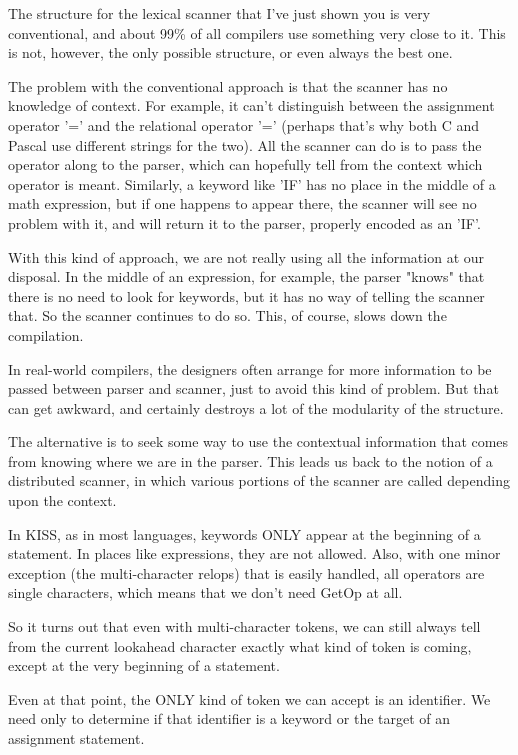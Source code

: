 \documentclass[float=false, crop=false]{standalone}
\begin{document}
The structure for the lexical scanner that I've just shown you is very
conventional, and about 99\% of all compilers use something very close to it.
This is not, however, the only possible structure, or even always the best one.

The problem with the conventional approach is that the scanner has no knowledge
of context. For example, it can't distinguish between the assignment operator
'=' and the relational operator '=' (perhaps that's why both C and Pascal use
different strings for the two). All the scanner can do is to pass the operator
along to the parser, which can hopefully tell from the context which operator is
meant. Similarly, a keyword like 'IF' has no place in the middle of a math
expression, but if one happens to appear there, the scanner will see no problem
with it, and will return it to the parser, properly encoded as an 'IF'.

With this kind of approach, we are not really using all the information at our
disposal. In the middle of an expression, for example, the parser "knows" that
there is no need to look for keywords, but it has no way of telling the scanner
that. So the scanner continues to do so. This, of course, slows down the
compilation.

In real-world compilers, the designers often arrange for more information to be
passed between parser and scanner, just to avoid this kind of problem. But that
can get awkward, and certainly destroys a lot of the modularity of the
structure.

The alternative is to seek some way to use the contextual information that comes
from knowing where we are in the parser. This leads us back to the notion of a
distributed scanner, in which various portions of the scanner are called
depending upon the context.

In KISS, as in most languages, keywords ONLY appear at the beginning of a
statement. In places like expressions, they are not allowed. Also, with one
minor exception (the multi-character relops) that is easily handled, all
operators are single characters, which means that we don't need GetOp at all.

So it turns out that even with multi-character tokens, we can still always tell
from the current lookahead character exactly what kind of token is coming,
except at the very beginning of a statement.

Even at that point, the ONLY kind of token we can accept is an identifier. We
need only to determine if that identifier is a keyword or the target of an
assignment statement.
\end{document}

